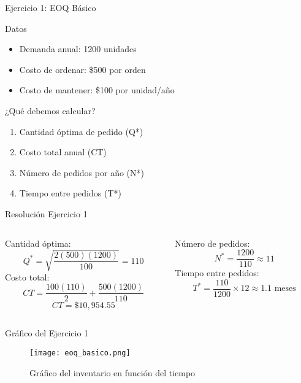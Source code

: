 \documentclass{beamer}
\begin{document}
\begin{frame}{Ejercicio 1: EOQ Básico}
    \begin{block}{Datos}
        \begin{itemize}
            \item Demanda anual: 1200 unidades
            \item Costo de ordenar: \$500 por orden
            \item Costo de mantener: \$100 por unidad/año
        \end{itemize}
    \end{block}
    \pause
    \begin{alertblock}{¿Qué debemos calcular?}
        \begin{enumerate}
            \item Cantidad óptima de pedido (Q*)
            \item Costo total anual (CT)
            \item Número de pedidos por año (N*)
            \item Tiempo entre pedidos (T*)
        \end{enumerate}
    \end{alertblock}
\end{frame}

\begin{frame}{Resolución Ejercicio 1}
    \begin{columns}[T]
        \begin{column}{0.5\textwidth}
            \textcolor{primary}{Cantidad óptima:}
            \[ Q^* = \sqrt{\frac{2(500)(1200)}{100}} = 110 \]
            \vspace{0.5cm}
            \textcolor{primary}{Costo total:}
            \[ CT = \frac{100(110)}{2} + \frac{500(1200)}{110} \]
            \[ CT = \$10,954.55 \]
        \end{column}
        \begin{column}{0.5\textwidth}
            \textcolor{primary}{Número de pedidos:}
            \[ N^* = \frac{1200}{110} \approx 11 \]
            \vspace{0.5cm}
            \textcolor{primary}{Tiempo entre pedidos:}
            \[ T^* = \frac{110}{1200} \times 12 \approx 1.1 \text{ meses} \]
        \end{column}
    \end{columns}
\end{frame}

\begin{frame}{Gráfico del Ejercicio 1}
    \begin{figure}
        \centering
        \texttt{[image: eoq\_basico.png]}
        \caption{Gráfico del inventario en función del tiempo}
    \end{figure}
\end{frame}
\end{document}

